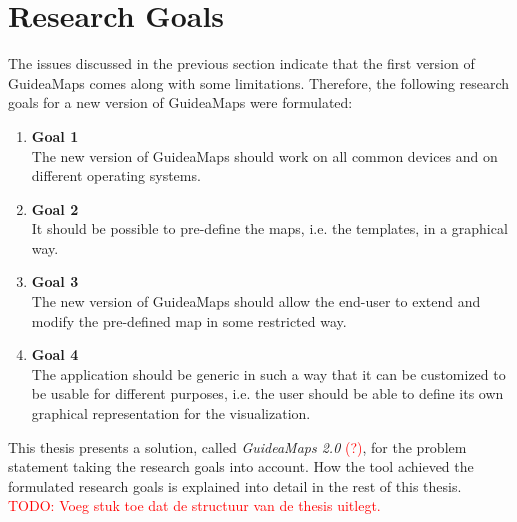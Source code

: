 \section{Research Goals}\label{sec:research-goals}
The issues discussed in the previous section indicate that the first version of GuideaMaps comes along with some limitations. Therefore, the following research goals for a new version of GuideaMaps were formulated:

\begin{enumerate}[label={\textcolor{white}{\arabic*}},ref=\arabic*]
	\item \hspace*{-2.5em}\textbf{Goal 1\label{item:goal:device-os-independent}} \hfill \\
	The new version of GuideaMaps should work on all common devices and on different operating systems.
	
	\item \hspace*{-2.5em}\textbf{Goal 2\label{item:goal:templates}} \hfill \\
	It should be possible to pre-define the maps, i.e. the templates, in a graphical way.
	
	\item \hspace*{-2.5em}\textbf{Goal 3\label{item:goal:extend-modify}} \hfill \\
	The new version of GuideaMaps should allow the end-user to extend and modify the pre-defined map in some restricted way.
	
	\item \hspace*{-2.5em}\textbf{Goal 4\label{item:goal:generic}} \hfill \\
	The application should be generic in such a way that it can be customized to be usable for different purposes, i.e. the user should be able to define its own graphical representation for the visualization.
\end{enumerate}

This thesis presents a solution, called \textit{GuideaMaps 2.0} \textcolor{red}{(?)}, for the problem statement taking the research goals into account. How the tool achieved the formulated research goals is explained into detail in the rest of this thesis.\\
\textcolor{red}{TODO: Voeg stuk toe dat de structuur van de thesis uitlegt.}



